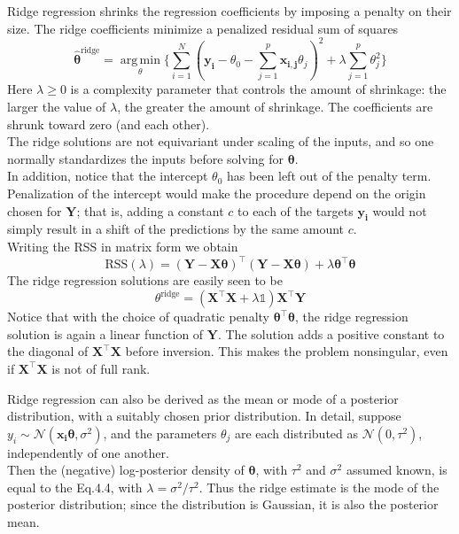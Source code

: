 \documentclass[twoside]{article}
\DeclareMathOperator*{\argmin}{arg\,min}
\begin{document}
Ridge regression shrinks the regression coefficients by imposing a penalty on their size. The ridge coefficients minimize a penalized residual sum of squares
\begin{equation*}
    \hat{\boldsymbol{\theta}}^\text{ridge} = \argmin\limits_\theta\{\sum\limits_{i = 1}^{N}(\boldsymbol{y_i} - \theta_0 - \sum\limits_{j = 1}^{p}\boldsymbol{x_{i, j}}\theta_j)^2 + \lambda\sum\limits_{j = 1}^{p}\theta_j^2\}
\end{equation*}
Here $\lambda \geq 0$ is a complexity parameter that controls the amount of shrinkage: the larger the value of $\lambda$, the greater the amount of shrinkage. The coefficients are shrunk toward zero (and each other).\\
The ridge solutions are not equivariant under scaling of the inputs, and so one normally standardizes the inputs before solving for $\boldsymbol{\theta}$.\\
In addition, notice that the intercept $\theta_0$ has been left out of the penalty term. Penalization of the intercept would make the procedure depend on the origin
chosen for $\boldsymbol{Y}$; that is, adding a constant $c$ to each of the targets $\boldsymbol{y_i}$ would
not simply result in a shift of the predictions by the same amount $c$. \\
Writing the RSS in matrix form we obtain
\begin{equation*}
    \text{RSS}(\lambda) = (\boldsymbol{Y} - \boldsymbol{X\theta})^\intercal(\boldsymbol{Y} - \boldsymbol{X\theta}) + \lambda\boldsymbol{\theta}^\intercal\boldsymbol{\theta}
\end{equation*}
The ridge regression solutions are easily seen to be
\begin{equation}
    \theta^{\text{ridge}} = (\boldsymbol{X^\intercal{X}} + \lambda\mathds{1})\boldsymbol{X}^\intercal\boldsymbol{Y}
\end{equation}
Notice that with the choice of quadratic penalty $\boldsymbol{\theta^\intercal\theta}$, the ridge regression solution is again a linear function of $\boldsymbol{Y}$. The solution adds a positive constant to the diagonal of $\boldsymbol{X^\intercal{X}}$ before inversion. This makes the problem nonsingular, even if $\boldsymbol{X^\intercal{X}}$ is not of full rank.\medskip

Ridge regression can also be derived as the mean or mode of a posterior distribution, with a suitably chosen prior distribution. In detail, suppose $y_i \sim \mathcal{N}(\boldsymbol{x_i\theta}, \sigma^2)$, and the parameters $\theta_j$ are each distributed as $\mathcal{N}(0, \tau^2)$, independently of one another.\\ Then the (negative) log-posterior density of $\boldsymbol{\theta}$, with $\tau^2$ and $\sigma^2$ assumed known, is equal to the Eq.4.4, with $\lambda = \sigma^2 / \tau^2$. Thus the ridge estimate is the mode of the posterior distribution; since the distribution is Gaussian, it is also the posterior mean.\medskip
\end{document}
